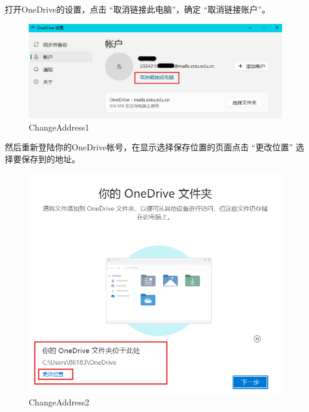 \documentclass[]{ctexbook}
\theoremstyle{definition}
\theoremstyle{definition}
\theoremstyle{definition}
\theoremstyle{definition}
\theoremstyle{remark}
\begin{document}
打开OneDrive的设置，点击 ``取消链接此电脑''，确定 ``取消链接账户''。

\begin{figure}

{\centering \includegraphics[width=1\linewidth]{img/OneDrive/ChangeAddress1} 

}

\caption{ChangeAddress1}\label{fig:OneDrive-ChangeAddress1}
\end{figure}

然后重新登陆你的OneDrive帐号，在显示选择保存位置的页面点击 ``更改位置'' 选择要保存到的地址。

\begin{figure}

{\centering \includegraphics[width=1\linewidth]{img/OneDrive/ChangeAddress2} 

}

\caption{ChangeAddress2}\label{fig:OneDrive-ChangeAddress2}
\end{figure}
\end{document}
